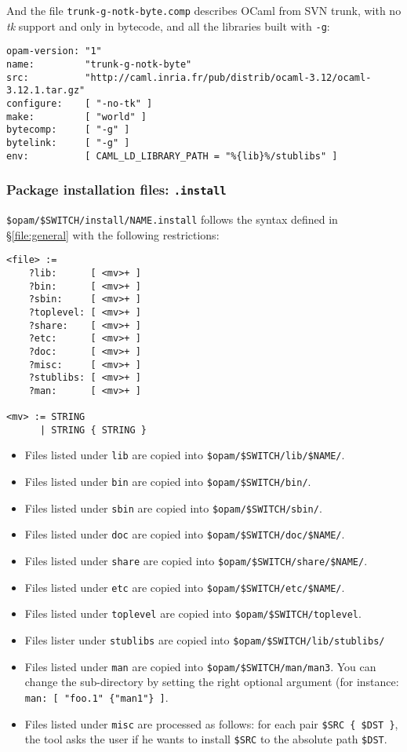 \documentclass[a4paper,10pt]{article}
\begin{document}
And the file {\tt trunk-g-notk-byte.comp} describes OCaml from SVN
trunk, with no {\em tk} support and only in bytecode, and all the
libraries built with {\tt -g}:

\begin{verbatim}
opam-version: "1"
name:         "trunk-g-notk-byte"
src:          "http://caml.inria.fr/pub/distrib/ocaml-3.12/ocaml-3.12.1.tar.gz"
configure:    [ "-no-tk" ]
make:         [ "world" ]
bytecomp:     [ "-g" ]
bytelink:     [ "-g" ]
env:          [ CAML_LD_LIBRARY_PATH = "%{lib}%/stublibs" ]
\end{verbatim}


\subsubsection{Package installation files: {\tt *.install}}
\label{file:install}

\verb+$opam/$SWITCH/install/NAME.install+ follows the syntax defined
in \S\ref{file:general} with the following restrictions:

{\small
\begin{Verbatim}[frame=single]
<file> :=
    ?lib:      [ <mv>+ ]
    ?bin:      [ <mv>+ ]
    ?sbin:     [ <mv>+ ]
    ?toplevel: [ <mv>+ ]
    ?share:    [ <mv>+ ]
    ?etc:      [ <mv>+ ]
    ?doc:      [ <mv>+ ]
    ?misc:     [ <mv>+ ]
    ?stublibs: [ <mv>+ ]
    ?man:      [ <mv>+ ]

<mv> := STRING
      | STRING { STRING }
\end{Verbatim}
}

\begin{itemize}
\item Files listed under {\tt lib} are copied into \verb+$opam/$SWITCH/lib/$NAME/+.
\item Files listed under {\tt bin} are copied into \verb+$opam/$SWITCH/bin/+.
\item Files listed under {\tt sbin} are copied into \verb+$opam/$SWITCH/sbin/+.
\item Files listed under {\tt doc} are copied into \verb+$opam/$SWITCH/doc/$NAME/+.
\item Files listed under {\tt share} are copied into \verb+$opam/$SWITCH/share/$NAME/+.
\item Files listed under {\tt etc} are copied into \verb+$opam/$SWITCH/etc/$NAME/+.
\item Files listed under {\tt toplevel} are copied into \verb+$opam/$SWITCH/toplevel+.
\item Files lister under {\tt stublibs} are copied into \verb+$opam/$SWITCH/lib/stublibs/+
\item Files listed under {\tt man} are copied into
  \verb+$opam/$SWITCH/man/man3+. You can change the sub-directory by setting
  the right optional argument (for instance:
  \verb+man: [ "foo.1" {"man1"} ]+.
\item Files listed under {\tt misc} are processed as follows:
  for each pair \verb+$SRC { $DST }+, the tool asks the user if
  he wants to install \verb+$SRC+ to the absolute path \verb+$DST+.
\end{itemize}
\end{document}

